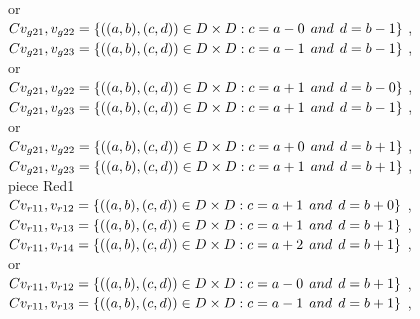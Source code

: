 \\or
\\$C{v_{g21},v_{g22}}=\{((a,b),(c,d))\in D\times D: c = a - 0\hspace{1ex} and \hspace{1ex}  d = b - 1 \}$ , 
\\$C{v_{g21},v_{g23}}=\{((a,b),(c,d))\in D\times D: c = a - 1\hspace{1ex} and \hspace{1ex}  d = b - 1 \}$ , 
\\or
\\$C{v_{g21},v_{g22}}=\{((a,b),(c,d))\in D\times D: c = a + 1\hspace{1ex} and \hspace{1ex}  d = b - 0 \}$ , 
\\$C{v_{g21},v_{g23}}=\{((a,b),(c,d))\in D\times D: c = a + 1\hspace{1ex} and \hspace{1ex}  d = b - 1 \}$ , 
\\or
\\$C{v_{g21},v_{g22}}=\{((a,b),(c,d))\in D\times D: c = a + 0\hspace{1ex} and \hspace{1ex}  d = b + 1 \}$ , 
\\$C{v_{g21},v_{g23}}=\{((a,b),(c,d))\in D\times D: c = a + 1\hspace{1ex} and \hspace{1ex}  d = b + 1 \}$ , 
\\ piece Red1 
\\$C{v_{r11},v_{r12}}=\{((a,b),(c,d))\in D\times D: c = a + 1\hspace{1ex} and \hspace{1ex}  d = b + 0 \}$ , 
\\$C{v_{r11},v_{r13}}=\{((a,b),(c,d))\in D\times D: c = a + 1\hspace{1ex} and \hspace{1ex}  d = b + 1 \}$ , 
\\$C{v_{r11},v_{r14}}=\{((a,b),(c,d))\in D\times D: c = a + 2\hspace{1ex} and \hspace{1ex}  d = b + 1 \}$ , 
\\or
\\$C{v_{r11},v_{r12}}=\{((a,b),(c,d))\in D\times D: c = a - 0\hspace{1ex} and \hspace{1ex}  d = b + 1 \}$ , 
\\$C{v_{r11},v_{r13}}=\{((a,b),(c,d))\in D\times D: c = a - 1\hspace{1ex} and \hspace{1ex}  d = b + 1 \}$ , 

